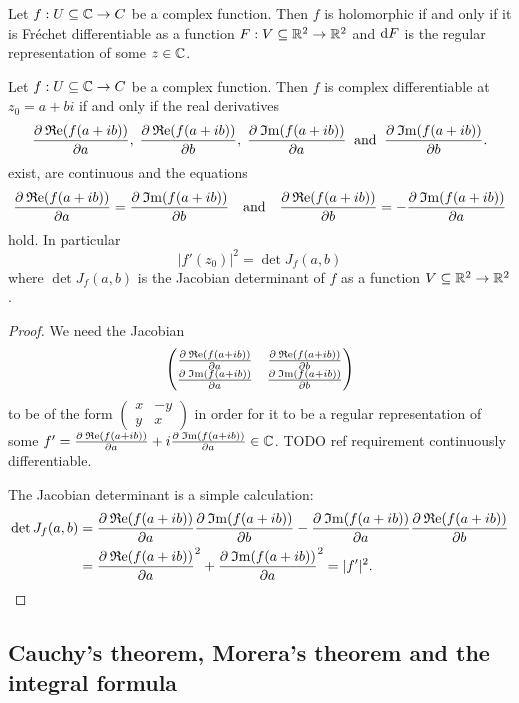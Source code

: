 \begin{lemma}
Let $f: U\subseteq \C \to C$ be a complex function. Then $f$ is holomorphic \textup{if and only if} it is Fréchet differentiable as a function $F: V\subseteq \R^2 \to \R^2$ and $\diff F$ is the regular representation of some $z\in \C$.
\end{lemma}
\begin{corollary}
Let $f: U\subseteq \C \to C$ be a complex function. Then $f$ is complex differentiable at $z_0 = a+bi$ \textup{if and only if} the real derivatives
\[ \pd{\Re(f(a + ib))}{a},\; \pd{\Re(f(a + ib))}{b},\;
\pd{\Im(f(a + ib))}{a} \;\;\text{and}\;\; \pd{\Im(f(a + ib))}{b}. \]
exist, are continuous and the equations
\[
\pd{\Re(f(a + ib))}{a} = \pd{\Im(f(a + ib))}{b} \quad\text{and}\quad \pd{\Re(f(a + ib))}{b} = -\pd{\Im(f(a + ib))}{a} \]
hold. In particular
\[ |f'(z_0)|^2 = \det J_f(a,b) \]
where $\det J_f(a,b)$ is the Jacobian determinant of $f$ as a function $V\subseteq \R^2 \to \R^2$.
\end{corollary}
\begin{proof}
We need the Jacobian
\[ \begin{pmatrix}
\pd{\Re(f(a + ib))}{a} & \pd{\Re(f(a + ib))}{b} \\
\pd{\Im(f(a + ib))}{a} & \pd{\Im(f(a + ib))}{b}
\end{pmatrix} \]
to be of the form $\begin{pmatrix}
x & -y \\ y & x
\end{pmatrix}$ in order for it to be a regular representation of some $f' =\pd{\Re(f(a + ib))}{a} + i\pd{\Im(f(a + ib))}{a} \in \C$. TODO ref requirement continuously differentiable.

The Jacobian determinant is a simple calculation:
\begin{align*}
\det J_f(a,b) &= \pd{\Re(f(a + ib))}{a}\pd{\Im(f(a + ib))}{b} - \pd{\Im(f(a + ib))}{a}\pd{\Re(f(a + ib))}{b} \\
&= \pd{\Re(f(a + ib))}{a}^2 + \pd{\Im(f(a + ib))}{a}^2 = |f'|^2.
\end{align*}
\end{proof}

\subsection{Cauchy's theorem, Morera's theorem and the integral formula}

